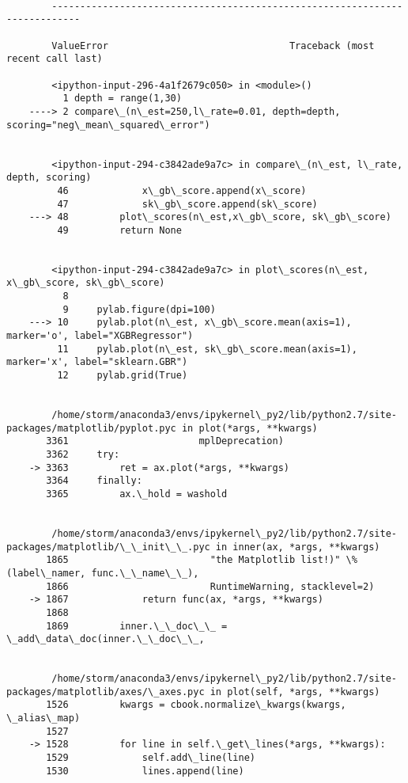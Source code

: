 \documentclass[11pt]{article}
\begin{document}
    \begin{Verbatim}[commandchars=\\\{\}]

        ---------------------------------------------------------------------------

        ValueError                                Traceback (most recent call last)

        <ipython-input-296-4a1f2679c050> in <module>()
          1 depth = range(1,30)
    ----> 2 compare\_(n\_est=250,l\_rate=0.01, depth=depth, scoring="neg\_mean\_squared\_error")
    

        <ipython-input-294-c3842ade9a7c> in compare\_(n\_est, l\_rate, depth, scoring)
         46             x\_gb\_score.append(x\_score)
         47             sk\_gb\_score.append(sk\_score)
    ---> 48         plot\_scores(n\_est,x\_gb\_score, sk\_gb\_score)
         49         return None


        <ipython-input-294-c3842ade9a7c> in plot\_scores(n\_est, x\_gb\_score, sk\_gb\_score)
          8 
          9     pylab.figure(dpi=100)
    ---> 10     pylab.plot(n\_est, x\_gb\_score.mean(axis=1), marker='o', label="XGBRegressor")
         11     pylab.plot(n\_est, sk\_gb\_score.mean(axis=1), marker='x', label="sklearn.GBR")
         12     pylab.grid(True)


        /home/storm/anaconda3/envs/ipykernel\_py2/lib/python2.7/site-packages/matplotlib/pyplot.pyc in plot(*args, **kwargs)
       3361                       mplDeprecation)
       3362     try:
    -> 3363         ret = ax.plot(*args, **kwargs)
       3364     finally:
       3365         ax.\_hold = washold


        /home/storm/anaconda3/envs/ipykernel\_py2/lib/python2.7/site-packages/matplotlib/\_\_init\_\_.pyc in inner(ax, *args, **kwargs)
       1865                         "the Matplotlib list!)" \% (label\_namer, func.\_\_name\_\_),
       1866                         RuntimeWarning, stacklevel=2)
    -> 1867             return func(ax, *args, **kwargs)
       1868 
       1869         inner.\_\_doc\_\_ = \_add\_data\_doc(inner.\_\_doc\_\_,


        /home/storm/anaconda3/envs/ipykernel\_py2/lib/python2.7/site-packages/matplotlib/axes/\_axes.pyc in plot(self, *args, **kwargs)
       1526         kwargs = cbook.normalize\_kwargs(kwargs, \_alias\_map)
       1527 
    -> 1528         for line in self.\_get\_lines(*args, **kwargs):
       1529             self.add\_line(line)
       1530             lines.append(line)



\end{Verbatim}
\end{document}
